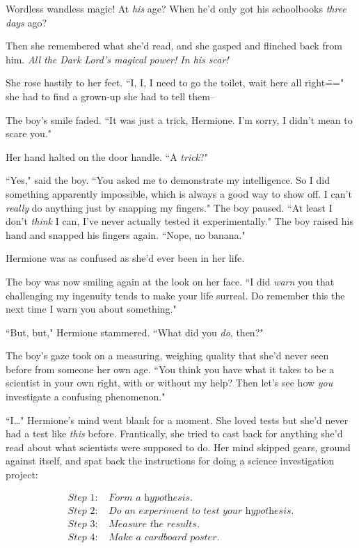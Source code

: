 Wordless wandless magic! At \emph{his} age? When he'd only got his schoolbooks \emph{three days} ago?

Then she remembered what she'd read, and she gasped and flinched back from him. \emph{All the Dark Lord's magical power! In his scar!}

She rose hastily to her feet. ``I, I, I need to go the toilet, wait here all right\===" she had to find a grown-up she had to tell them\---

The boy's smile faded. ``It was just a trick, Hermione. I'm sorry, I didn't mean to scare you."

Her hand halted on the door handle. ``A \emph{trick}?"

``Yes," said the boy. ``You asked me to demonstrate my intelligence. So I did something apparently impossible, which is always a good way to show off. I can't \emph{really} do anything just by snapping my fingers." The boy paused. ``At least I don't \emph{think} I can, I've never actually tested it experimentally." The boy raised his hand and snapped his fingers again. ``Nope, no banana."

Hermione was as confused as she'd ever been in her life.

The boy was now smiling again at the look on her face. ``I did \emph{warn} you that challenging my ingenuity tends to make your life surreal. Do remember this the next time I warn you about something."

``But, but," Hermione stammered. ``What did you \emph{do}, then?"

The boy's gaze took on a measuring, weighing quality that she'd never seen before from someone her own age. ``You think you have what it takes to be a scientist in your own right, with or without my help? Then let's see how \emph{you} investigate a confusing phenomenon."

``I{\ldots}" Hermione's mind went blank for a moment. She loved tests but she'd never had a test like \emph{this} before. Frantically, she tried to cast back for anything she'd read about what scientists were supposed to do. Her mind skipped gears, ground against itself, and spat back the instructions for doing a science investigation project:

\begin{align*}
\textit{Step 1:}&\textit{ Form a hypothesis.}\\
\textit{Step 2:}&\textit{ Do an experiment to test your hypothesis.}\\
\textit{Step 3:}&\textit{ Measure the results.}\\
\textit{Step 4:}&\textit{ Make a cardboard poster.}
\end{align*}

